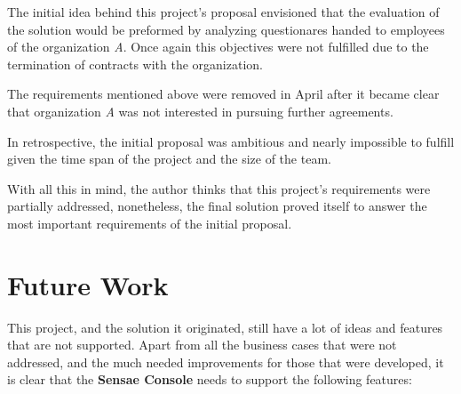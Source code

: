 The initial idea behind this project's proposal envisioned that the evaluation of the solution would be preformed by analyzing questionares handed to employees of the organization \textit{A}. Once again this objectives were not fulfilled due to the termination of contracts with the organization.   

The requirements mentioned above were removed in April after it became clear that organization \textit{A} was not interested in pursuing further agreements.

In retrospective, the initial proposal was ambitious and nearly impossible to fulfill given the time span of the project and the size of the team.

With all this in mind, the author thinks that this project's requirements were partially addressed, nonetheless, the final solution proved itself to answer the most important requirements of the initial proposal.

\section{Future Work}
\label{sec:conclusion:future}

This project, and the solution it originated, still have a lot of ideas and features that are not supported. Apart from all the business cases that were not addressed, and the much needed improvements for those that were developed, it is clear that the \textbf{Sensae Console} needs to support the following features:


